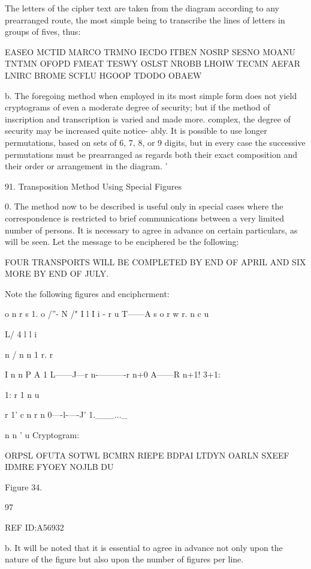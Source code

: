{The letters of the cipher text are taken from the diagram according
to any prearranged route, the most simple being to transcribe the lines
of letters in groups of ﬁves, thus:

EASEO MCTID MARCO TRMNO IECDO ITBEN
NOSRP SESNO MOANU TNTMN OFOPD FMEAT
TESWY OSLST NROBB LHOIW TECMN AEFAR
LNIRC BROME SCFLU HGOOP TDODO OBAEW

b. The foregoing method when employed in its most simple form
does not yield cryptograms of even a moderate degree of security;
but if the method of inscription and transcription is varied and made
more. complex, the degree of security may be increased quite notice-
ably. It is possible to use longer permutations, based on sets of 6,
7, 8, or 9 digits, but in every case the successive permutations must
be prearranged as regards both their exact composition and their order
or arrangement in the diagram. '

91. Transposition Method Using Special Figures

0. The method now to be described is useful only in special cases
where the correspondence is restricted to brief communications between
a very limited number of persons. It is necessary to agree in advance on
certain particulars, as will be seen. Let the message to be enciphered
be the following:

FOUR TRANSPORTS WILL BE COMPLETED BY END
OF APRIL AND SIX MORE BY END OF JULY.

Note the following ﬁgures and enciphcrment:

 

 

 

 

 

 

o n r s 1. o
/”- N /" I l I i -
r u T——A s o r w r. n c u

L/ 4 l l i

n / n n 1 r. r

I n n P A 1
L——J—r n-———-r n+0 A——R n+1! 3+1:

1: r 1 n u

r 1'
c n r n 0—-l-—-J’ 1.___..._

n n ' u
Cryptogram:

ORPSL OFUTA SOTWL BCMRN RIEPE BDPAI
LTDYN OARLN SXEEF IDMRE FYOEY NOJLB
DU

Figure 34.

97

REF ID:A56932

b. It will be noted that it is essential to agree in advance not only
upon the nature of the ﬁgure but also upon the number of ﬁgures per
line.

}
